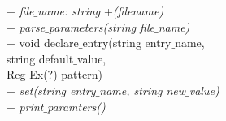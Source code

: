 {
+ \textit{file$\_$name: string}
}
{
+\textit{\dunder(filename)}\\
+ \textit{parse$\_$parameters(string file$\_$name)} \\
+ void declare$\_$entry(string entry$\_$name, \\ string default$\_$value, \\ Reg$\_$Ex(?) pattern)\\
+ \textit{set(string entry$\_$name, string new$\_$value)}\\
+ \textit{print$\_$paramters()}
}
